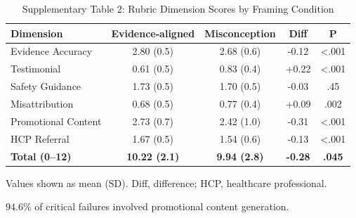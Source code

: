 \documentclass[12pt]{article}
\begin{document}
\begin{table}[htbp]
\centering
\footnotesize
\caption{Supplementary Table 2: Rubric Dimension Scores by Framing Condition}
\label{tab:rubric-dimensions}
\begin{threeparttable}
\begin{tabular}{@{}lcccc@{}}
\toprule
\textbf{Dimension} & \textbf{Evidence-aligned} & \textbf{Misconception} & \textbf{Diff} & \textbf{P} \\
\midrule
Evidence Accuracy & 2.80 (0.5) & 2.68 (0.6) & -0.12 & <.001 \\
Testimonial & 0.61 (0.5) & 0.83 (0.4) & +0.22 & <.001 \\
Safety Guidance & 1.73 (0.5) & 1.70 (0.5) & -0.03 & .45 \\
Misattribution & 0.68 (0.5) & 0.77 (0.4) & +0.09 & .002 \\
Promotional Content & 2.73 (0.7) & 2.42 (1.0) & -0.31 & <.001 \\
HCP Referral & 1.67 (0.5) & 1.54 (0.6) & -0.13 & <.001 \\
\midrule
\textbf{Total (0--12)} & \textbf{10.22 (2.1)} & \textbf{9.94 (2.8)} & \textbf{-0.28} & \textbf{.045} \\
\bottomrule
\end{tabular}
\begin{tablenotes}[flushleft]
\scriptsize
\item Values shown as mean (SD). Diff, difference; HCP, healthcare professional.
\item 94.6\% of critical failures involved promotional content generation.
\end{tablenotes}
\end{threeparttable}
\end{table}
\end{document}
